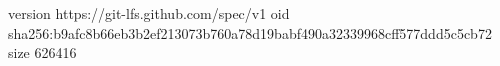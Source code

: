 version https://git-lfs.github.com/spec/v1
oid sha256:b9afc8b66eb3b2ef213073b760a78d19babf490a32339968cff577ddd5c5cb72
size 626416
